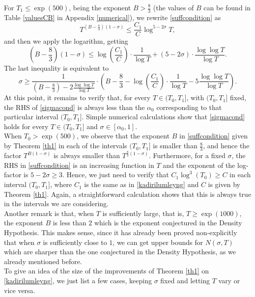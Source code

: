\documentclass[reqno]{amsart}
\numberwithin{equation}{section}
\theoremstyle{remark}
\begin{document}
For $T_1\le \exp(500)$, being the exponent $B>\frac{8}{3}$ (the values of $B$ can be found in Table \ref{valuesCB} in Appendix \ref{numerical}), we rewrite \eqref{suffcondition} as 
\begin{equation*}
   T^{(B-\frac{8}{3})(1-\sigma)}\le \frac{C_1}{C}\log^{5-2\sigma}T, 
\end{equation*}
and then we apply the logarithm, getting
\[
\left(B-\frac{8}{3}\right)(1-\sigma)\le \log\left(\frac{C_1}{C}\right)\cdot \frac{1}{\log T}+(5-2\sigma)\cdot\frac{\log\log T}{\log T}.
\]
The last inequality is equivalent to 
\begin{equation}\label{sigmacond}
    \sigma\ge \frac{1}{\left(B-\frac{8}{3}\right)-2\frac{\log\log T}{\log T}}\cdot \left(B-\frac{8}{3}-\log\left(\frac{C_1}{C}\right)\cdot \frac{1}{\log T}-5\frac{\log\log T}{\log T}\right).
\end{equation}
At this point, it remains to verify that, for every $T\in(T_0,T_1]$, with $(T_0,T_1]$ fixed, the RHS of \eqref{sigmacond} is always less than the $\alpha_0$ corresponding to that particular interval $(T_0,T_1]$. Simple numerical calculations show that \eqref{sigmacond} holds for every $T\in(T_0,T_1]$ and $\sigma\in[\alpha_0,1]$.\\
When $T_0>\exp(500)$, we observe that the exponent $B$ in \eqref{suffcondition} given by Theorem \ref{th1} in each of the intervals $(T_0,T_1]$ is smaller than $\frac{8}{3}$, and hence the factor $T^{B(1-\sigma)}$ is always smaller than $T^{\frac{8}{3}(1-\sigma)}$. Furthermore, for a fixed $\sigma$, the RHS in \eqref{suffcondition} is an increasing function in $T$ and the exponent of the log-factor is $5-2\sigma\ge 3$. Hence, we just need to verify that $C_1\log^3(T_0)\ge C$ in each interval $(T_0,T_1]$, where $C_1$ is the same as in \eqref{kadirilumleyng} and $C$ is given by Theorem \ref{th1}. Again, a straightforward calculation shows that this is always true in the intervals we are considering.\\
Another remark is that, when $T$ is sufficiently large, that is, $T\ge \exp(1000)$, the exponent $B$ is less than $2$ which is the exponent conjectured in the Density Hypothesis. This makes sense, since it has already been proved non-explicitly that when $\sigma$ is sufficiently close to $1$, we can get upper bounds for $N(\sigma,T)$ which are sharper than the one conjectured in the Density Hypothesis, as we already mentioned before.\\
To give an idea of the size of the improvements of Theorem \ref{th1} on \eqref{kadirilumleyng}, we just list a few cases, keeping $\sigma$ fixed and letting $T$ vary or vice versa.
\end{document}

